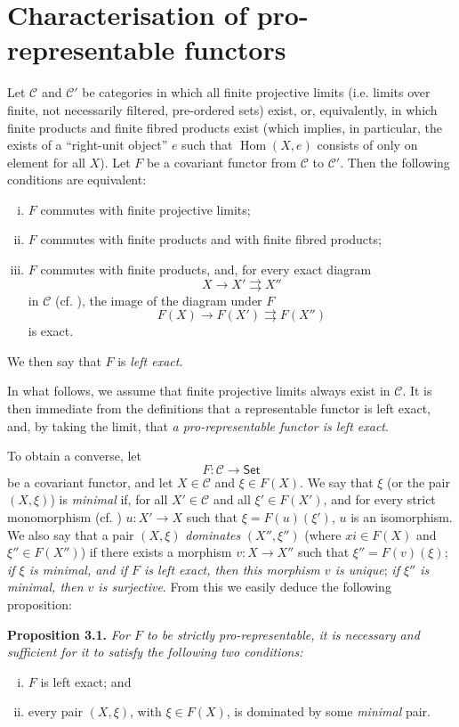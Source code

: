 \documentclass{article}
\newenvironment{itenv}[1]
  {\phantomsection\par\medskip\noindent\textbf{#1.}\itshape}
  {\medskip}
\renewcommand{\cal}[1]{{\mathcal{#1}}}
\newcommand{\Set}{\mathsf{Set}}
\DeclareMathOperator{\Hom}{Hom}
\newcommand{\oldpage}[1]{\marginpar{\footnotesize$\Big\vert$ \textit{p.~#1}}}
\begin{document}
\section{Characterisation of pro-representable functors}
\label{A.3}

Let $\cal{C}$ and $\cal{C}'$ be categories in which all finite projective limits (i.e. limits over finite, not necessarily filtered, pre-ordered sets) exist, or, equivalently, in which finite products and finite fibred products exist (which implies, in particular, the exists of a ``right-unit object'' $e$ such that $\Hom(X,e)$ consists of only on element for all $X$).
Let $F$ be a covariant functor from $\cal{C}$ to $\cal{C}'$.
Then the following conditions are equivalent:
\begin{enumerate}[(i)]
  \item $F$ commutes with finite projective limits;
  \item $F$ commutes with finite products and with finite fibred products;
  \item $F$ commutes with finite products, and, for every exact diagram
    \[
      X\to X'\rightrightarrows X''
    \]
    in $\cal{C}$ (cf. \cite[A, Definition 2.1]{3}), the image of the diagram under $F$
    \[
      F(X)\to F(X')\rightrightarrows F(X'')
    \]
    is exact.
\end{enumerate}
We then say that $F$ is \emph{left exact}.

In what follows, we assume that finite projective limits always exist in $\cal{C}$.
It is then immediate from the definitions that a representable functor is left exact, and, by taking the limit, that \emph{a pro-representable functor is left exact}.

To obtain a converse, let
\[
  F\colon \cal{C} \to \Set
\]
be a covariant functor, and let $X\in\cal{C}$ and $\xi\in F(X)$.
We say that $\xi$ (or the pair
\oldpage{195-06}
$(X,\xi)$) is \emph{minimal} if, for all $X'\in\cal{C}$ and all $\xi'\in F(X')$, and for every strict monomorphism (cf. \cite[A, \S2]{3}) $u\colon X'\to X$ such that $\xi=F(u)(\xi')$, $u$ is an isomorphism.
We also say that a pair $(X,\xi)$ \emph{dominates} $(X'',\xi'')$ (where $xi\in F(X)$ and $\xi''\in F(X'')$) if there exists a morphism $v\colon X\to X''$ such that $\xi''=F(v)(\xi)$;
\emph{if $\xi$ is minimal, and if $F$ is left exact, then this morphism $v$ is unique};
\emph{if $\xi''$ is minimal, then $v$ is surjective}.
From this we easily deduce the following proposition:

\begin{itenv}{Proposition 3.1}
\label{A.3-proposition1}
  For $F$ to be strictly pro-representable, it is necessary and sufficient for it to satisfy the following two conditions:
  \begin{enumerate}[(i)]
    \item $F$ is left exact; and
    \item every pair $(X,\xi)$, with $\xi\in F(X)$, is dominated by some \emph{minimal} pair.
  \end{enumerate}
\end{itenv}
\end{document}
